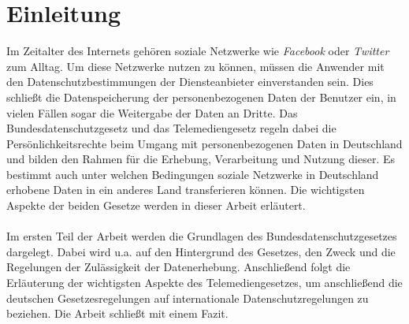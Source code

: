 \chapter{Einleitung}
Im Zeitalter des Internets gehören soziale Netzwerke wie \textit{Facebook} oder \textit{Twitter} zum Alltag. Um diese Netzwerke nutzen zu können, müssen die Anwender mit den Datenschutzbestimmungen der Diensteanbieter einverstanden sein. Dies schließt die Datenspeicherung der personenbezogenen Daten der Benutzer ein, in vielen Fällen sogar die Weitergabe der Daten an Dritte. Das Bundesdatenschutzgesetz und das Telemediengesetz regeln dabei die Persönlichkeitsrechte beim Umgang mit personenbezogenen Daten in Deutschland und bilden den Rahmen für die Erhebung, Verarbeitung und Nutzung dieser. Es bestimmt auch unter welchen Bedingungen soziale Netzwerke in Deutschland erhobene Daten in ein anderes Land transferieren können. Die wichtigsten Aspekte der beiden Gesetze werden in dieser Arbeit erläutert.\\
\\Im ersten Teil der Arbeit werden die Grundlagen des Bundesdatenschutzgesetzes dargelegt. Dabei wird u.a. auf den Hintergrund des Gesetzes, den Zweck und die Regelungen der Zulässigkeit der Datenerhebung. Anschließend folgt die Erläuterung der wichtigsten Aspekte des Telemediengesetzes, um anschließend die deutschen Gesetzesregelungen auf internationale Datenschutzregelungen zu beziehen. Die Arbeit schließt mit einem Fazit.